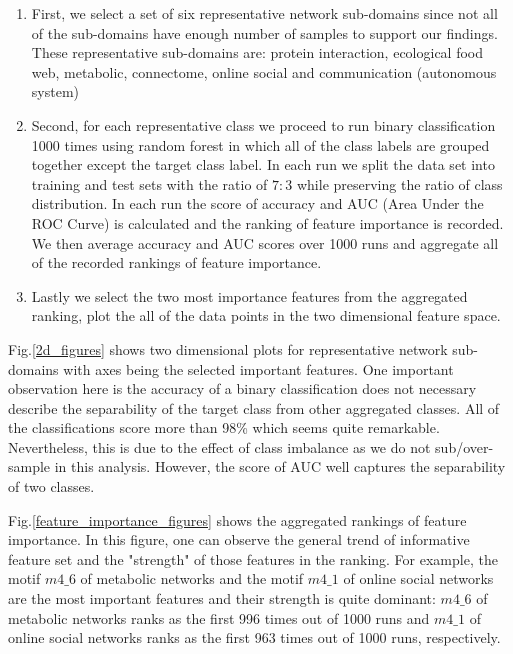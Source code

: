 \documentclass{article}
\begin{document}
\begin{enumerate}[label={}]
	\item First, we select a set of six representative network sub-domains since not all of the sub-domains have enough number of samples to support our findings. These representative sub-domains are: protein interaction, ecological food web, metabolic, connectome,  online social and communication (autonomous system)
	\item Second, for each representative class we proceed to run binary classification 1000 times using random forest in which all of the class labels are grouped together except the target class label. In each run we split the data set into training and test sets with the ratio of $7:3$ while preserving the ratio of class distribution. In each run the score of accuracy and AUC (Area Under the ROC Curve) is calculated and the ranking of feature importance is recorded. We then average accuracy and AUC scores over 1000 runs and aggregate all of the recorded rankings of feature importance.
	\item Lastly we select the two most importance features from the aggregated ranking, plot the all of the data points in the two dimensional feature space.
\end{enumerate}

Fig.\ref{2d_figures} shows two dimensional plots for representative network sub-domains with axes being the selected important features.
One important observation here is the accuracy of a binary classification does not necessary describe the separability of the target class from other aggregated classes. All of the classifications score more than 98\% which seems quite remarkable. Nevertheless, this is due to the effect of class imbalance as we do not sub/over-sample in this analysis. However, the score of AUC well captures the separability of two classes. 

Fig.\ref{feature_importance_figures} shows the aggregated rankings of feature importance. In this figure, one can observe the general trend of informative feature set and the "strength" of those features in the ranking. For example, the motif $m4\_6$ of metabolic networks and the motif $m4\_1$ of online social networks are the most important features and their strength is quite dominant:  $m4\_6$ of metabolic networks ranks as the first 996 times out of 1000 runs and $m4\_1$ of online social networks ranks as the first 963 times  out of 1000 runs, respectively.

\end{document}
